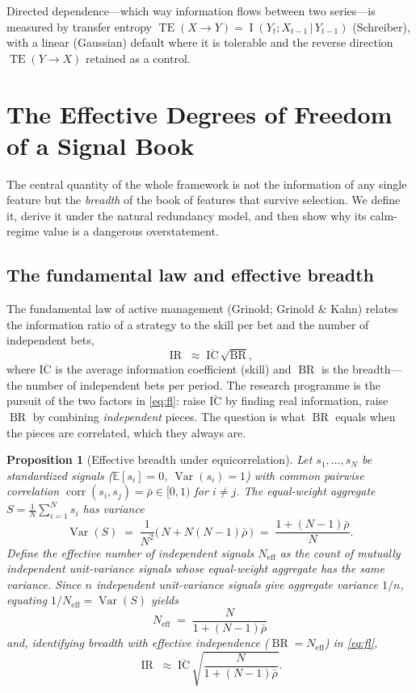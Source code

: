 \documentclass[11pt,a4paper]{article}
\theoremstyle{definition}
\theoremstyle{plain}
\newtheorem{proposition}{Proposition}[section]
\newcommand{\E}{\mathbb{E}}
\newcommand{\corr}{\operatorname{corr}}
\newcommand{\Var}{\operatorname{Var}}
\newcommand{\Neff}{N_{\mathrm{eff}}}
\newcommand{\ICbar}{\overline{\mathrm{IC}}}
\newcommand{\rhobar}{\bar{\rho}}
\newcommand{\given}{\,\vert\,}
\DeclareMathOperator{\MI}{I}
\DeclareMathOperator{\TE}{TE}
\DeclareMathOperator{\IR}{IR}
\DeclareMathOperator{\BR}{BR}
\begin{document}
Directed dependence---which way information flows between two series---is measured by transfer
entropy $\TE(X\to Y)=\MI(Y_{t};X_{t-1}\given Y_{t-1})$ (Schreiber), with a linear (Gaussian)
default where it is tolerable and the reverse direction $\TE(Y\to X)$ retained as a control.

\section{The Effective Degrees of Freedom of a Signal Book}
\label{sec:dof}

The central quantity of the whole framework is not the information of any single feature but the
\emph{breadth} of the book of features that survive selection. We define it, derive it under the
natural redundancy model, and then show why its calm-regime value is a dangerous overstatement.

\subsection{The fundamental law and effective breadth}

The fundamental law of active management (Grinold; Grinold \& Kahn) relates the information ratio of
a strategy to the skill per bet and the number of independent bets,
\begin{equation}
   \IR \;\approx\; \ICbar \,\sqrt{\BR},
   \label{eq:fl}
\end{equation}
where $\ICbar$ is the average information coefficient (skill) and $\BR$ is the breadth---the number
of independent bets per period. The research programme is the pursuit of the two factors in
\eqref{eq:fl}: raise $\ICbar$ by finding real information, raise $\BR$ by combining \emph{independent}
pieces. The question is what $\BR$ equals when the pieces are correlated, which they always are.

\begin{proposition}[Effective breadth under equicorrelation]
\label{prop:neff}
Let $s_1,\dots,s_N$ be standardized signals ($\E[s_i]=0$, $\Var(s_i)=1$) with common pairwise
correlation $\corr(s_i,s_j)=\rhobar\in[0,1)$ for $i\neq j$. The equal-weight aggregate
$S=\tfrac{1}{N}\sum_{i=1}^{N}s_i$ has variance
\[
   \Var(S) \;=\; \frac{1}{N^2}\Big(\,N + N(N-1)\rhobar\,\Big)
            \;=\; \frac{1+(N-1)\rhobar}{N}.
\]
Define the \emph{effective number of independent signals} $\Neff$ as the count of mutually
independent unit-variance signals whose equal-weight aggregate has the same variance. Since $n$
independent unit-variance signals give aggregate variance $1/n$, equating $1/\Neff=\Var(S)$ yields
\begin{equation}
   \boxed{\;\Neff \;=\; \dfrac{N}{1+(N-1)\rhobar}\;}
   \label{eq:neff}
\end{equation}
and, identifying breadth with effective independence ($\BR=\Neff$) in \eqref{eq:fl},
\[
   \IR \;\approx\; \ICbar\,\sqrt{\dfrac{N}{1+(N-1)\rhobar}}.
\]
\end{proposition}
\end{document}
